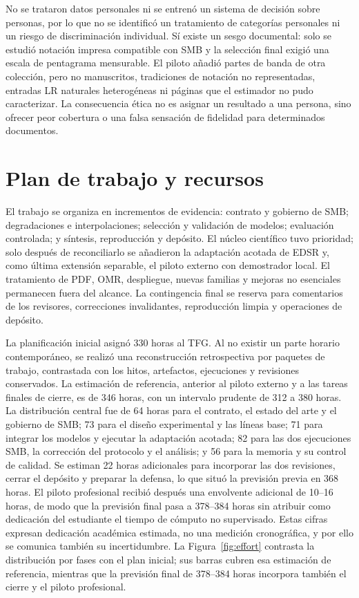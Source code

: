 No se trataron datos personales ni se entrenó un sistema de decisión sobre personas, por lo que no
se identificó un tratamiento de categorías personales ni un riesgo de discriminación individual.
Sí existe un sesgo documental: solo se estudió notación impresa compatible con SMB y la selección
final exigió una escala de pentagrama mensurable. El piloto añadió partes de banda de otra
colección, pero no manuscritos, tradiciones de notación no representadas, entradas LR naturales
heterogéneas ni páginas que el estimador no pudo caracterizar. La consecuencia ética no es asignar
un resultado a una persona, sino ofrecer peor cobertura o una falsa
sensación de fidelidad para determinados documentos.

\section{Plan de trabajo y recursos}
El trabajo se organiza en incrementos de evidencia: contrato y gobierno de SMB; degradaciones e
interpolaciones; selección y validación de modelos; evaluación controlada; y síntesis, reproducción
y depósito. El núcleo científico tuvo prioridad; solo después de reconciliarlo se añadieron la
adaptación acotada de EDSR y, como última extensión separable, el piloto externo con demostrador
local. El tratamiento de PDF, OMR, despliegue, nuevas familias y mejoras no esenciales permanecen
fuera del alcance. La contingencia final se reserva para comentarios de los
revisores, correcciones invalidantes, reproducción limpia y operaciones de depósito.

La planificación inicial asignó 330 horas al TFG. Al no existir un parte horario contemporáneo,
se realizó una reconstrucción retrospectiva por paquetes de trabajo, contrastada con los hitos,
artefactos, ejecuciones y revisiones conservados. La estimación de referencia, anterior al piloto
externo y a las tareas finales de cierre, es
de 346 horas, con un intervalo prudente de 312 a 380 horas. La distribución central fue de 64 horas
para el contrato, el estado del arte y el gobierno de SMB; 73 para el diseño experimental y las
líneas base; 71 para integrar los modelos y ejecutar la adaptación acotada; 82 para las dos ejecuciones SMB,
la corrección del protocolo y el análisis; y 56 para la memoria y su control de calidad. Se estiman
22 horas adicionales para incorporar las dos revisiones, cerrar el depósito y preparar la defensa,
lo que situó la previsión previa en 368 horas. El piloto profesional recibió después una envolvente
adicional de 10--16 horas, de modo que la previsión final pasa a 378--384 horas sin atribuir como
dedicación del estudiante el tiempo de cómputo no supervisado. Estas cifras
expresan dedicación académica estimada, no una medición cronográfica, y por ello se comunica también
su incertidumbre.
La Figura~\ref{fig:effort} contrasta la distribución por fases con el plan inicial; sus barras
cubren esa estimación de referencia, mientras que la previsión final de
378--384 horas incorpora también el cierre y el piloto profesional.

